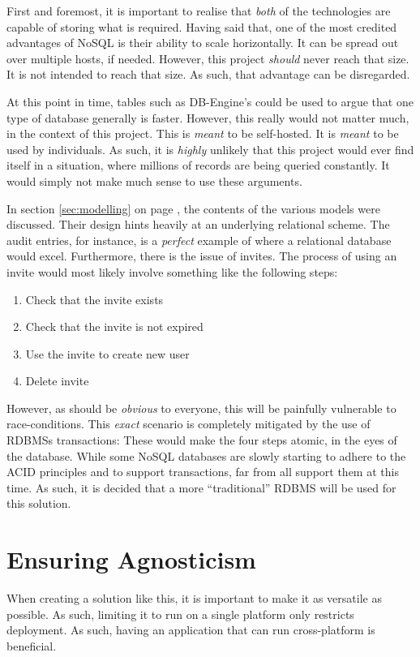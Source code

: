 		First and foremost, it is important to realise that \emph{both} of the technologies are capable of storing what is required. Having said that, one of the most credited advantages of NoSQL is their ability to scale horizontally. It can be spread out over multiple hosts, if needed. However, this project \emph{should} never reach that size. It is not intended to reach that size. As such, that advantage can be disregarded.

		At this point in time, tables such as DB-Engine's\cite{db_rankings} could be used to argue that one type of database generally is faster. However, this really would not matter much, in the context of this project. This is \emph{meant} to be self-hosted. It is \emph{meant} to be used by individuals. As such, it is \emph{highly} unlikely that this project would ever find itself in a situation, where millions of records are being queried constantly. It would simply not make much sense to use these arguments.

		In section \ref{sec:modelling} on page \pageref{sec:modelling}, the contents of the various models were discussed. Their design hints heavily at an underlying relational scheme. The audit entries, for instance, is a \emph{perfect} example of where a relational database would excel. Furthermore, there is the issue of invites. The process of using an invite would most likely involve something like the following steps:
		\begin{enumerate}
			\item Check that the invite exists
			\item Check that the invite is not expired
			\item Use the invite to create new user
			\item Delete invite
		\end{enumerate}
		However, as should be \emph{obvious} to everyone, this will be painfully vulnerable to race-conditions. This \emph{exact} scenario is completely mitigated by the use of RDBMSs transactions: These would make the four steps atomic, in the eyes of the database. While some NoSQL databases are slowly starting to adhere to the ACID principles and to support transactions, far from all support them at this time. As such, it is decided that a more ``traditional'' RDBMS will be used for this solution.

	\section{Ensuring Agnosticism}
		When creating a solution like this, it is important to make it as versatile as possible. As such, limiting it to run on a single platform only restricts deployment. As such, having an application that can run cross-platform is beneficial.

